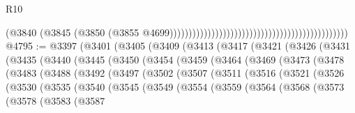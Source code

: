 \begin{lexlean}{R10}
\begin{coremodule}
{{{{{{{{{{{{{{{{{{{{{{{{{{{{{{{{{{{{{{{{{{{{{{{{{{{{{{{{{{{{{{{{{{{{{{{{{{{{{{{{{{{{                                                                                          (@3840
                                                                                            (@3845
                                                                                              (@3850
                                                                                                (@3855
                                                                                                  @4699)))))))))))))))))))))))))))))))))))))))))))))))
@4795 := @3397
    (@3401
      (@3405
        (@3409
          (@3413
            (@3417
              (@3421
                (@3426
                  (@3431
                    (@3435
                      (@3440
                        (@3445
                          (@3450
                            (@3454
                              (@3459
                                (@3464
                                  (@3469
                                    (@3473
                                      (@3478
                                        (@3483
                                          (@3488
                                            (@3492
                                              (@3497
                                                (@3502
                                                  (@3507
                                                    (@3511
                                                      (@3516
                                                        (@3521
                                                          (@3526
                                                            (@3530
                                                              (@3535
                                                                (@3540
                                                                  (@3545
                                                                    (@3549
                                                                      (@3554
                                                                        (@3559
                                                                          (@3564
                                                                            (@3568
                                                                              (@3573
                                                                                (@3578
                                                                                  (@3583
                                                                                    (@3587
}}}}}}}}}}}}}}}}}}}}}}}}}}}}}}}}}}}}}}}}}}}}}}}}}}}}}}}}}}}}}}}}}}}}}}}}}}}}}}}}}}}}
\end{coremodule}
\end{lexlean}
